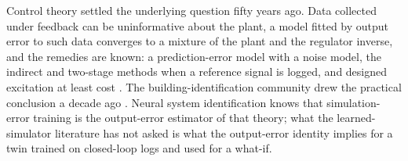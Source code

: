 \documentclass[11pt]{article}
\begin{document}
Control theory settled the underlying question fifty years ago. Data collected under feedback can be uninformative about the plant, a model fitted by output error to such data converges to a mixture of the plant and the regulator inverse, and the remedies are known: a prediction-error model with a noise model, the indirect and two-stage methods when a reference signal is logged, and designed excitation at least cost \citep{gustavsson1977,ljung1999,forssell1999,vandenhof1993,bombois2006}. The building-identification community drew the practical conclusion a decade ago \citep{bacher2011,privara2013}. Neural system identification knows that simulation-error training is the output-error estimator of that theory; what the learned-simulator literature has not asked is what the output-error identity implies for a twin trained on closed-loop logs and used for a what-if.
\end{document}
